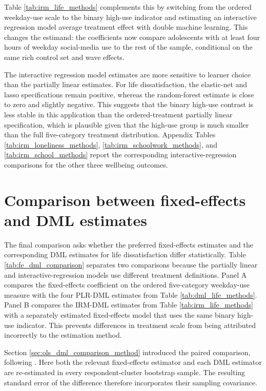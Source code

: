 \documentclass[11pt,oneside,a4paper]{book}
\newcommand{\tocsection}[2]{%
  \section[#1]{#2}%
}
\begin{document}
Table \ref{tab:irm_life_methods} complements this by switching from the ordered weekday-use scale to the binary high-use indicator and estimating an interactive regression model average treatment effect with double machine learning. This changes the estimand: the coefficients now compare adolescents with at least four hours of weekday social-media use to the rest of the sample, conditional on the same rich control set and wave effects.



The interactive regression model estimates are more sensitive to learner choice than the partially linear estimates. For life dissatisfaction, the elastic-net and lasso specifications remain positive, whereas the random-forest estimate is close to zero and slightly negative. This suggests that the binary high-use contrast is less stable in this application than the ordered-treatment partially linear specification, which is plausible given that the high-use group is much smaller than the full five-category treatment distribution. Appendix Tables \ref{tab:irm_loneliness_methods}, \ref{tab:irm_schoolwork_methods}, and \ref{tab:irm_school_methods} report the corresponding interactive-regression comparisons for the other three wellbeing outcomes.

\tocsection{Comparison Between Fixed-Effects and DML Estimates}{Comparison between fixed-effects and DML estimates}

The final comparison asks whether the preferred fixed-effects estimates and the corresponding DML estimates for life dissatisfaction differ statistically. Table \ref{tab:fe_dml_comparison} separates two comparisons because the partially linear and interactive-regression models use different treatment definitions. Panel A compares the fixed-effects coefficient on the ordered five-category weekday-use measure with the four PLR-DML estimates from Table \ref{tab:dml_life_methods}. Panel B compares the IRM-DML estimates from Table \ref{tab:irm_life_methods} with a separately estimated fixed-effects model that uses the same binary high-use indicator. This prevents differences in treatment scale from being attributed incorrectly to the estimation method.

Section \ref{sec:ols_dml_comparison_method} introduced the paired comparison, following \citet{helal2026returns}. Here both the relevant fixed-effects estimator and each DML estimator are re-estimated in every respondent-cluster bootstrap sample. The resulting standard error of the difference therefore incorporates their sampling covariance.
\end{document}
